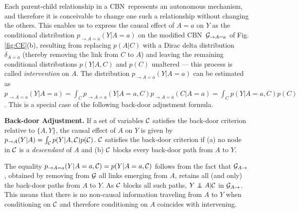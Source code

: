 \documentclass[runningheads]{llncs}
\newcommand{\figref}[1]{Fig. \ref{#1}}
\newcommand\independent{\protect\mathpalette{\protect\independenT}{\perp}}
\def\independenT#1#2{\mathrel{\rlap{$#1#2$}\mkern2mu{#1#2}}}
\newcommand{\CBN}{CBN}
\begin{document}
Each parent-child relationship in a \CBN~represents an autonomous mechanism, and therefore it is conceivable to change one such a relationship without changing the others. This enables us to express the causal effect of $A=a$ on $Y$
as the conditional distribution $p_{\rightarrow A=a}(Y|A=a)$ on the modified \CBN~${\cal G}_{\rightarrow A=a}$ of \figref{fig:CE}(b), resulting from replacing $p(A|C)$ with a Dirac delta distribution $\delta_{A=a}$ (thereby removing the link from $C$ to $A$) and leaving the remaining conditional distributions $p(Y|A,C)$ and $p(C)$ unaltered --- this process is called \emph{intervention} on $A$.
The distribution $p_{\rightarrow A=a}(Y|A=a)$ can be estimated as $p_{\rightarrow A=a}(Y|A=a) = \int_C p_{\rightarrow A=a}(Y|A=a,C)p_{\rightarrow A=a}(C|A=a) = \int_C p(Y|A=a,C)p(C)$. This is a special case of the following back-door adjustment formula.

{\bf Back-door Adjustment.} If a set of variables ${\cal C}$ satisfies the back-door criterion relative to $\{A, Y\}$, the causal effect of $A$ on $Y$ is given by $p_{\rightarrow A}(Y|A)=\int_{\cal C} p(Y|A,{\cal C})p({\cal C})$.
${\cal C}$ satisfies the back-door criterion if (a) no node in ${\cal C}$ is a \emph{descendant} of $A$
and (b) ${\cal C}$ blocks every back-door path from $A$ to $Y$.

The equality $p_{\rightarrow A=a}(Y|A=a,{\cal C}) = p(Y|A=a,{\cal C})$ follows from the fact that ${\cal G}_{A \rightarrow}$, obtained by removing from ${\cal G}$ all links emerging from $A$, retains all (and only) the back-door paths from $A$ to $Y$. As ${\cal C}$ blocks all such paths, $Y\independent A|{\cal C}$ in 
${\cal G}_{A \rightarrow}$. This means that there is no non-causal information traveling from $A$ to $Y$ when conditioning on ${\cal C}$ and therefore conditioning on $A$ coincides with intervening.
\end{document}
